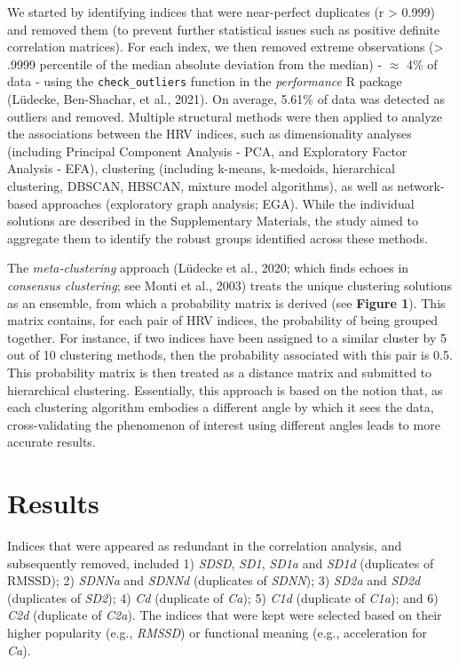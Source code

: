 \documentclass[
  english,
  jou,floatsintext]{apa6}
\begin{document}
We started by identifying indices that were near-perfect duplicates (\textbar r\textbar{} \textgreater{} 0.999) and removed them (to prevent further statistical issues such as positive definite correlation matrices). For each index, we then removed extreme observations (\textgreater{} .9999 percentile of the median absolute deviation from the median) - \(\approx\) 4\% of data - using the \texttt{check\_outliers} function in the \emph{performance} R package (Lüdecke, Ben-Shachar, et al., 2021). On average, 5.61\% of data was detected as outliers and removed. Multiple structural methods were then applied to analyze the associations between the HRV indices, such as dimensionality analyses (including Principal Component Analysis - PCA, and Exploratory Factor Analysis - EFA), clustering (including k-means, k-medoids, hierarchical clustering, DBSCAN, HBSCAN, mixture model algorithms), as well as network-based approaches (exploratory graph analysis; EGA). While the individual solutions are described in the Supplementary Materials, the study aimed to aggregate them to identify the robust groups identified across these methods.

The \emph{meta-clustering} approach (Lüdecke et al., 2020; which finds echoes in \emph{consensus clustering}; see Monti et al., 2003) treats the unique clustering solutions as an ensemble, from which a probability matrix is derived (see \textbf{Figure 1}). This matrix contains, for each pair of HRV indices, the probability of being grouped together. For instance, if two indices have been assigned to a similar cluster by 5 out of 10 clustering methods, then the probability associated with this pair is 0.5. This probability matrix is then treated as a distance matrix and submitted to hierarchical clustering. Essentially, this approach is based on the notion that, as each clustering algorithm embodies a different angle by which it sees the data, cross-validating the phenomenon of interest using different angles leads to more accurate results.

\hypertarget{results}{%
\section{Results}\label{results}}

Indices that were appeared as redundant in the correlation analysis, and subsequently removed, included 1) \emph{SDSD}, \emph{SD1}, \emph{SD1a} and \emph{SD1d} (duplicates of RMSSD); 2) \emph{SDNNa} and \emph{SDNNd} (duplicates of \emph{SDNN}); 3) \emph{SD2a} and \emph{SD2d} (duplicates of \emph{SD2}); 4) \emph{Cd} (duplicate of \emph{Ca}); 5) \emph{C1d} (duplicate of \emph{C1a}); and 6) \emph{C2d} (duplicate of \emph{C2a}). The indices that were kept were selected based on their higher popularity (e.g., \emph{RMSSD}) or functional meaning (e.g., acceleration for \emph{Ca}).
\end{document}
